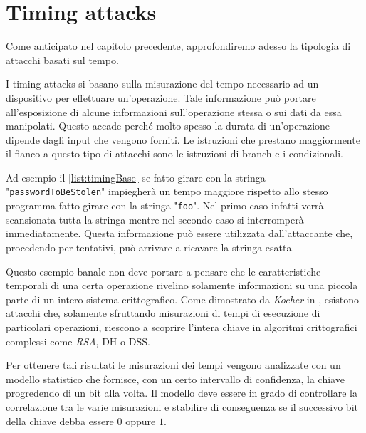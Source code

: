 \chapter{Timing attacks}
Come anticipato nel capitolo precedente, approfondiremo adesso la tipologia di attacchi basati sul tempo. 

I timing attacks si basano sulla misurazione del tempo necessario ad un dispositivo per effettuare un'operazione. Tale informazione può portare all'esposizione di alcune informazioni sull'operazione stessa o sui dati da essa manipolati. Questo accade perché molto spesso la durata di un'operazione dipende dagli input che vengono forniti. Le istruzioni che prestano maggiormente il fianco a questo tipo di attacchi sono le istruzioni di branch e i condizionali.

\begin{center}
	
\end{center}

Ad esempio il \cref{list:timingBase} se fatto girare con la stringa "\texttt{passwordToBeStolen}" impiegherà un tempo maggiore rispetto allo stesso programma fatto girare con la stringa "\texttt{foo}". Nel primo caso infatti verrà scansionata tutta la stringa mentre nel secondo caso si interromperà immediatamente. Questa informazione può essere utilizzata dall'attaccante che, procedendo per tentativi, può arrivare a ricavare la stringa esatta.

Questo esempio banale non deve portare a pensare che le caratteristiche temporali di una certa operazione rivelino solamente informazioni su una piccola parte di un intero sistema crittografico. Come dimostrato da \emph{Kocher} in \cite{kocher1996timing}, esistono attacchi che, solamente sfruttando misurazioni di tempi di esecuzione di particolari operazioni, riescono a scoprire l'intera chiave in algoritmi crittografici complessi come \emph{RSA}, \ac{DH} o \ac{DSS}.

Per ottenere tali risultati le misurazioni dei tempi vengono analizzate con un modello statistico che fornisce, con un certo intervallo di confidenza, la chiave progredendo di un bit alla volta. Il modello deve essere in grado di controllare la correlazione tra le varie misurazioni e stabilire di conseguenza se il successivo bit della chiave debba essere $0$ oppure $1$.

